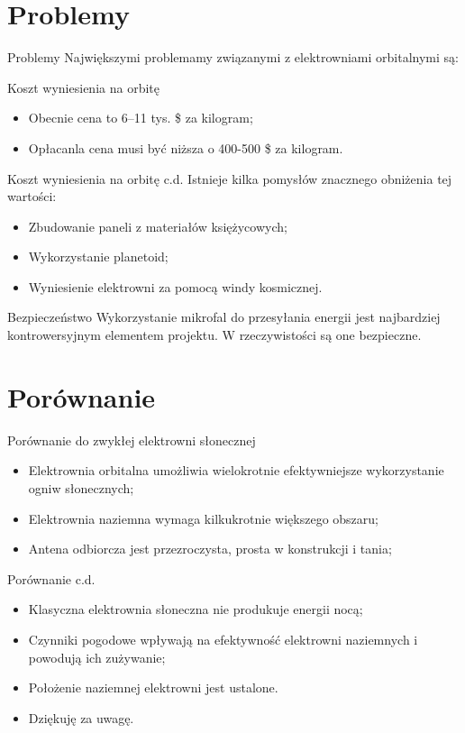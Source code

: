 \documentclass{beamer}
\begin{document}
\section{Problemy}
\begin{frame}{Problemy}
Największymi problemamy związanymi z elektrowniami orbitalnymi są:
\end{frame}
\begin{frame}{Koszt wyniesienia na orbitę}
\begin{itemize}
\item Obecnie cena to 6--11 tys. \$ za kilogram;
\item Opłacanla cena musi być niższa o 400-500 \$ za kilogram.
\end{itemize}
\end{frame}
\begin{frame}{Koszt wyniesienia na orbitę c.d.}
Istnieje kilka pomysłów znacznego obniżenia tej wartości:
\begin{itemize}
\pause
\item Zbudowanie paneli z materiałów księżycowych;
\pause
\item Wykorzystanie planetoid;
\pause
\item Wyniesienie elektrowni za pomocą windy kosmicznej.
\end{itemize}
\end{frame}
\begin{frame}{Bezpieczeństwo}
Wykorzystanie mikrofal do przesyłania energii jest najbardziej kontrowersyjnym elementem projektu. W rzeczywistości są one bezpieczne.
\end{frame}
\section{Porównanie}
\begin{frame}{Porównanie do zwykłej elektrowni słonecznej}
\begin{itemize}
\item Elektrownia orbitalna umożliwia wielokrotnie efektywniejsze wykorzystanie ogniw słonecznych;
\pause
\item Elektrownia naziemna wymaga kilkukrotnie większego obszaru;
\pause
\item Antena odbiorcza jest przezroczysta, prosta w konstrukcji i tania;
\end{itemize}
\end{frame}
\begin{frame}{Porównanie c.d.}
\begin{itemize}
\item<1-3> Klasyczna elektrownia słoneczna nie produkuje energii nocą;
\pause
\item<2-3> Czynniki pogodowe wpływają na efektywność elektrowni naziemnych i powodują ich zużywanie;
\pause
\item<-3> Położenie naziemnej elektrowni jest ustalone.
\item<4> Dziękuję za uwagę.
\end{itemize}
\end{frame}
\end{document}
